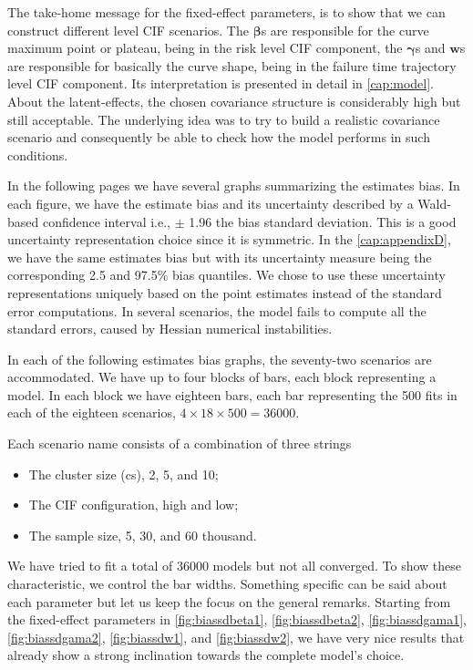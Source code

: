 The take-home message for the fixed-effect parameters, is to show that
we can construct different level CIF scenarios. The \(\bm{\beta}\)s are
responsible for the curve maximum point or plateau, being in the risk
level CIF component, the \(\bm{\gamma}\)s and \(\bm{w}\)s are
responsible for basically the curve shape, being in the failure time
trajectory level CIF component. Its interpretation is presented in
detail in \autoref{cap:model}. About the latent-effects, the chosen
covariance structure is considerably high but still acceptable. The
underlying idea was to try to build a realistic covariance scenario and
consequently be able to check how the model performs in such conditions.

In the following pages we have several graphs summarizing the estimates
bias. In each figure, we have the estimate bias and its uncertainty
described by a Wald-based confidence interval i.e., \(\pm\) 1.96 the
bias standard deviation. This is a good uncertainty representation
choice since it is symmetric. In the \autoref{cap:appendixD}, we have
the same estimates bias but with its uncertainty measure being the
corresponding 2.5 and 97.5\% bias quantiles. We chose to use these
uncertainty representations uniquely based on the point estimates
instead of the standard error computations. In several scenarios, the
model fails to compute all the standard errors, caused by Hessian
numerical instabilities.

In each of the following estimates bias graphs, the seventy-two
scenarios are accommodated. We have up to four blocks of bars, each
block representing a model. In each block we have eighteen bars, each
bar representing the 500 fits in each of the eighteen
scenarios, \(4 \times 18 \times 500 = 36000\).

Each scenario name consists of a combination of three strings
\begin{itemize}
 \item The cluster size (cs), 2, 5, and 10;
 \item The CIF configuration, high and low;
 \item The sample size, 5, 30, and 60 thousand.
\end{itemize}
We have tried to fit a total of 36000 models but not all converged. To
show these characteristic, we control the bar widths. Something specific
can be said about each parameter but let us keep the focus on the
general remarks. Starting from the fixed-effect parameters
in \autoref{fig:biassdbeta1}, \autoref{fig:biassdbeta2},
\autoref{fig:biassdgama1}, \autoref{fig:biassdgama2},
\autoref{fig:biassdw1}, and \autoref{fig:biassdw2}, we have very nice
results that already show a strong inclination towards the complete
model's choice.

